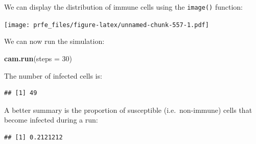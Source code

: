\documentclass[12pt,a4paper]{book}
\newenvironment{Shaded}{\begin{snugshade}}{\end{snugshade}}
\newcommand{\KeywordTok}[1]{\textcolor[rgb]{0.13,0.29,0.53}{\textbf{#1}}}
\newcommand{\DataTypeTok}[1]{\textcolor[rgb]{0.13,0.29,0.53}{#1}}
\newcommand{\DecValTok}[1]{\textcolor[rgb]{0.00,0.00,0.81}{#1}}
\newcommand{\StringTok}[1]{\textcolor[rgb]{0.31,0.60,0.02}{#1}}
\newcommand{\OtherTok}[1]{\textcolor[rgb]{0.56,0.35,0.01}{#1}}
\newcommand{\OperatorTok}[1]{\textcolor[rgb]{0.81,0.36,0.00}{\textbf{#1}}}
\newcommand{\NormalTok}[1]{#1}
\theoremstyle{definition}
\theoremstyle{definition}
\theoremstyle{definition}
\theoremstyle{remark}
\begin{document}
We can display the distribution of immune cells using the
\texttt{image()} function:

\begin{Shaded}
\end{Shaded}

\texttt{[image: prfe\_files/figure-latex/unnamed-chunk-557-1.pdf]}

We can now run the simulation:

\begin{Shaded}
\begin{Highlighting}[]
\KeywordTok{cam.run}\NormalTok{(}\DataTypeTok{steps =} \DecValTok{30}\NormalTok{)}
\end{Highlighting}
\end{Shaded}

The number of infected cells is:

\begin{Shaded}
\end{Shaded}

\begin{verbatim}
## [1] 49
\end{verbatim}

A better summary is the proportion of susceptible (i.e.~non-immune)
cells that become infected during a run:

\begin{Shaded}
\end{Shaded}

\begin{verbatim}
## [1] 0.2121212
\end{verbatim}
\end{document}
